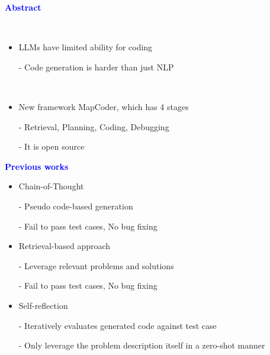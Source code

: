 \documentclass[professionalfont]{beamer}
\begin{document}
\frame{\titlepage}


\begin{frame}
\begin{center}
    { \textbf{\textcolor{blue}{ {\fontsize{12}{14}\selectfont Abstract} }} }
\end{center}
\\[0.5cm]

{\fontsize{10}{14}\selectfont 
\begin{itemize}
    \item LLMs have limited ability for coding
    
    - Code generation is harder than just NLP
\end{itemize}
\\[0.5cm]

\begin{itemize}
    \item New framework MapCoder, which has 4 stages
    
    - Retrieval, Planning, Coding, Debugging
    
    - It is open source
\end{itemize}
}

\end{frame}

\begin{frame}
\begin{center}
    { \textbf{\textcolor{blue}{ {\fontsize{12}{14}\selectfont Previous works} }} }
\end{center}

{\fontsize{10}{14}\selectfont 
\begin{itemize}
    \item Chain-of-Thought
    
    - Pseudo code-based generation
    
    - Fail to pass test cases, No bug fixing
\end{itemize}

\begin{itemize}
    \item Retrieval-based approach
    
    - Leverage relevant problems and solutions
    
    - Fail to pass test cases, No bug fixing
\end{itemize}

\begin{itemize}
    \item Self-reflection
    
    - Iteratively evaluates generated code against test case
    
    - Only leverage the problem description itself in a zero-shot manner
\end{itemize}
}

\end{frame}
\end{document}
